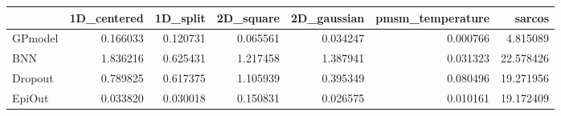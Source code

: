 \begin{tabular}{lrrrrrr}
\toprule
{} &  1D\_centered &  1D\_split &  2D\_square &  2D\_gaussian &  pmsm\_temperature &     sarcos \\
\midrule
GPmodel &     0.166033 &  0.120731 &   0.065561 &     0.034247 &          0.000766 &   4.815089 \\
BNN     &     1.836216 &  0.625431 &   1.217458 &     1.387941 &          0.031323 &  22.578426 \\
Dropout &     0.789825 &  0.617375 &   1.105939 &     0.395349 &          0.080496 &  19.271956 \\
EpiOut  &     0.033820 &  0.030018 &   0.150831 &     0.026575 &          0.010161 &  19.172409 \\
\bottomrule
\end{tabular}
